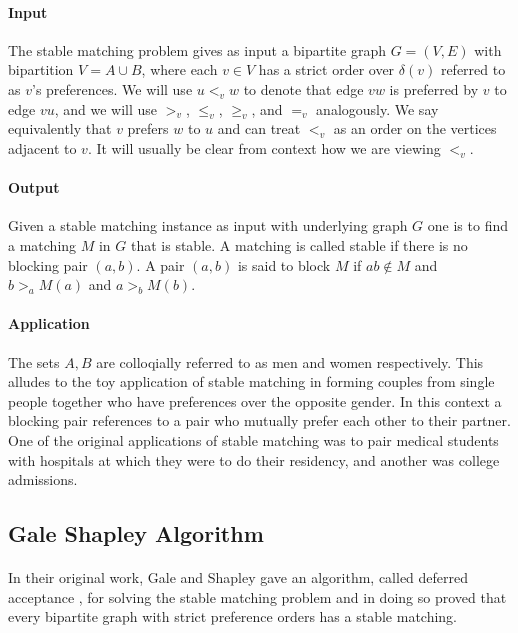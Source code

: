 \paragraph{Input}The stable matching problem gives as input a bipartite graph $G=(V, E)$ with bipartition $V = A\cup B$, where each $v \in V$ has a strict order over $\delta(v)$ referred to as $v$'s preferences. We will use $u <_v w$ to denote that edge $vw$ is preferred by $v$ to edge $vu$, and we will use $>_v$, $\leq_v$, $\geq_v$, and $=_v$ analogously. We say equivalently that $v$ prefers $w$ to $u$ and can treat $<_v$ as an order on the vertices adjacent to $v$. It will usually be clear from context how we are viewing $<_v$.
\paragraph{Output} Given a stable matching instance as input with underlying graph $G$ one is to find a matching $M$ in $G$ that is stable. A matching is called stable if there is no blocking pair $(a,b)$. A pair $(a,b)$ is said to block $M$ if $ab \not\in M$ and $b >_a M(a)$ and $a >_b M(b)$.
\paragraph{Application} The sets $A,B$ are colloqially referred to as men and women respectively. This alludes to the toy application of stable matching in forming couples from single people together who have preferences over the opposite gender. In this context a blocking pair references to a pair who mutually prefer each other to their partner. One of the original applications of stable matching \cite{roth1984evolution} was to pair medical students with hospitals at which they were to do their residency, and another was college admissions.
\subsection{Gale Shapley Algorithm}\label{SM:ALG}
\paragraph{}
In their original work, Gale and Shapley gave an algorithm, called deferred acceptance \cite{gale1962college}, for solving the stable matching problem and in doing so proved that every bipartite graph with strict preference orders has a stable matching.
